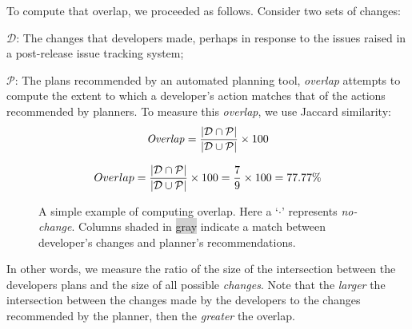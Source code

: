To compute that overlap, we proceeded as follows.
Consider  two sets of changes: 
\be
\item
$\mathcal{D}$: The changes that developers made, perhaps in response to the issues raised in a post-release issue tracking system; 
\item
$\mathcal{P}$: The plans recommended by an automated planning tool, \textit{overlap} attempts to compute the extent to which a developer's action matches that of the actions recommended by planners. 
\ee
To measure this \textit{overlap}, we use Jaccard similarity:
\begin{equation}
\setlength{\abovedisplayskip}{0pt}
\setlength{\belowdisplayskip}{0pt}
\label{eq:jaccard}
\mathit{Overlap} = \frac{|\mathcal{D} \cap \mathcal{P}|}{|\mathcal{D} \cup \mathcal{P}|}\times 100  
\end{equation}
\begin{figure}[pt!]
    \centering
    \begin{equation*}
        \setlength{\abovedisplayskip}{0em}
        \setlength{\belowdisplayskip}{-1.1em}
        Overlap = \frac{|\mathcal{D} \cap \mathcal{P}|}{|\mathcal{D} \cup \mathcal{P}|}\times 100 = \frac{7}{9}\times100 = 77.77\%
    \end{equation*}
    \caption{A simple example of computing overlap. Here a `$\cdot$' represents \textit{no-change}. Columns shaded in \colorbox{lightgray}{gray} indicate a match between developer's changes and planner's recommendations.}
    \label{fig:overlap_example}
    \end{figure}    
In other words, we measure the ratio of the size of the intersection between the developers plans and the size of all possible \textit{changes}.  Note
that  the {\em larger} the intersection between the changes made by the developers to the changes recommended by the planner, then the {\em greater} the overlap. 

